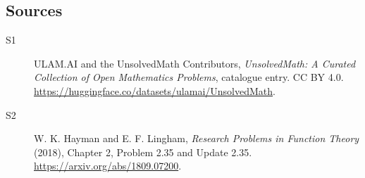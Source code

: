 \documentclass[11pt]{article}
\begin{document}
\subsection{Sources}
\begin{description}
\item[\hypertarget{source:statement:1}{S1}] ULAM.AI and the UnsolvedMath Contributors, \emph{UnsolvedMath: A Curated Collection of Open Mathematics Problems}, catalogue entry. CC BY 4.0. \url{https://huggingface.co/datasets/ulamai/UnsolvedMath}.
\item[\hypertarget{source:statement:2}{S2}] W. K. Hayman and E. F. Lingham, \emph{Research Problems in Function Theory} (2018), Chapter 2, Problem 2.35 and Update 2.35. \url{https://arxiv.org/abs/1809.07200}.
\end{description}
\label{end:statement}
\end{document}
